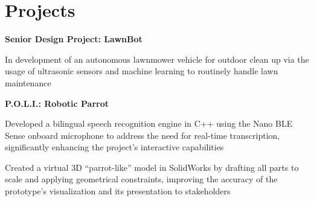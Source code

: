 \section{Projects}
    

    \vspace{0.2 cm}

    \begin{twocolentry}{}
        \textbf{Senior Design Project: LawnBot}
    \end{twocolentry}

    \vspace{0.10 cm}
    \begin{onecolentry}
        \begin{highlights}
            \item In development of an autonomous lawnmower vehicle for outdoor clean up via the usage of ultrasonic sensors and machine learning to routinely handle lawn maintenance
        \end{highlights}
    \end{onecolentry}
    
    \vspace{0.2 cm}

    \begin{twocolentry}{}
        \textbf{P.O.L.I.: Robotic Parrot}
    \end{twocolentry}

    \vspace{0.10 cm}
    \begin{onecolentry}
        \begin{highlights}
            \item Developed a bilingual speech recognition engine in C++ using the Nano BLE Sense onboard microphone to address the need for real-time transcription, significantly enhancing the project’s interactive capabilities
            \item Created a virtual 3D “parrot-like” model in SolidWorks by drafting all parts to scale and applying geometrical constraints, improving the accuracy of the prototype’s visualization and its presentation to stakeholders
        \end{highlights}
    \end{onecolentry}

